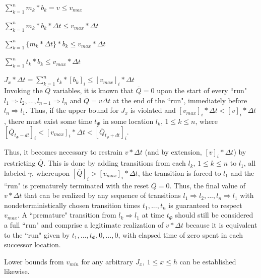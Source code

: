 $ \sum^{n}_{k=1} m_k * b_k = v \leq v_{max}$

$ \sum^{n}_{k=1} m_k * b_k * \Delta t \leq v_{max} * \Delta t$

$ \sum^{n}_{k=1} \{m_k * \Delta t\} * b_k \leq v_{max} * \Delta t$


$\sum^{n}_{k=1} t_k * b_k \leq v_{max} * \Delta t$

$J_x * \Delta t = \sum^{n}_{k=1} t_k * [b_k]_i \leq [v_{max}]_i * \Delta t$\\

Invoking the $\overline{Q}$ variables, it is known that $\overline{Q} = 0$ upon the start of every ``run" $l_1 \Rightarrow l_2, ..., l_{n-1} \Rightarrow l_n$ and $\overline{Q} = v \Delta t$ at the end of the ``run", immediately before $l_n \Rightarrow l_1$. Thus, if the upper bound for $J_x$ is violated and $[v_{max}]_i * \Delta t < [v]_i * \Delta t$, there must exist some time $t_{\Phi}$ in some location $l_k$, $1 \leq k \leq n$, where $[\overline{Q}_{t_{\Phi} - dt}]_i < [v_{max}]_i * \Delta t < [\overline{Q}_{t_{\Phi} + dt}]_i$.

Thus, it becomes necessary to restrain $v * \Delta t$ (and by extension, $[v]_i * \Delta t$) by restricting $\overline{Q}$. This is done by adding transitions from each $l_k$, $1 \leq k \leq n$ to $l_1$, all labeled $\gamma$, whereupon $[\overline{Q}]_i > [v_{max}]_i * \Delta t$, the transition is forced to $l_1$ and the ``run" is prematurely terminated with the reset $\overline{Q} = 0$. Thus, the final value of $v * \Delta t$ that can be realized by any sequence of transitions $l_1 \Rightarrow l_2, ..., l_n \Rightarrow l_1$ with nondeterministically chosen transition times $t_1, ..., t_n$ is guaranteed to respect $v_{max}$. A ``premature" transition from $l_k \Rightarrow l_1$ at time $t_{\Phi}$ should still be considered a full ``run" and comprise a legitimate realization of $v * \Delta t$ because it is equivalent to the ``run" given by $t_1, ..., t_{\Phi}, 0, ..., 0$, with elapsed time of zero spent in each successor location.

Lower bounds from $v_{min}$ for any arbitrary $J_x$, $1 \leq x \leq h$ can be established likewise.



